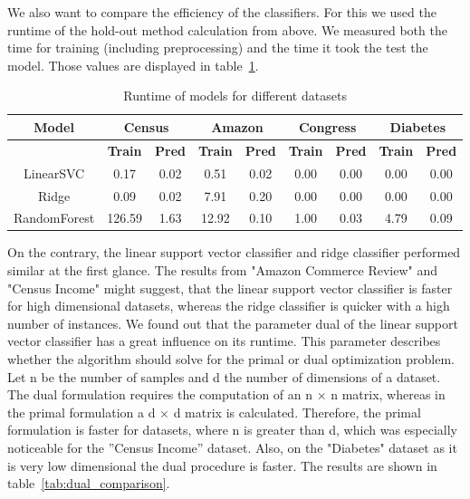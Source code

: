 \documentclass[a4paper,10pt]{article}
\begin{document}
 




We also want to compare the efficiency of the classifiers. For this we used the runtime of the hold-out
method calculation from above. We measured both the time for training (including preprocessing) and
the time it took the test the model. Those values are displayed in table~\ref{tab:runtime_models}.


\begin{table}[h!]
\centering
\footnotesize
\begin{tabular}{|c|c|c|c|c|c|c|c|c|}
\hline
\textbf{Model} & \multicolumn{2}{c|}{Census} & \multicolumn{2}{c|}{Amazon} & \multicolumn{2}{c|}{Congress} & \multicolumn{2}{c|}{Diabetes} \\
\hline
& \textbf{Train} & \textbf{Pred} & \textbf{Train} & \textbf{Pred} & \textbf{Train} & \textbf{Pred} & \textbf{Train} & \textbf{Pred} \\
\hline
LinearSVC & 0.17 & 0.02 & 0.51 & 0.02 & 0.00 & 0.00 & 0.00 & 0.00 \\
\hline
Ridge & 0.09 & 0.02 & 7.91 & 0.20 & 0.00 & 0.00 & 0.00 & 0.00 \\
\hline
RandomForest & 126.59 & 1.63 & 12.92 & 0.10 & 1.00 & 0.03 & 4.79 & 0.09 \\
\hline
\end{tabular}
\vspace{0.3cm}
\caption{Runtime of models for different datasets}
\label{tab:runtime_models}
\end{table}




On the contrary, the linear support vector classifier and ridge classifier performed similar
at the first glance. The results from "Amazon Commerce Review" and "Census Income" might suggest,
that the linear support vector classifier is faster for high dimensional datasets, whereas the ridge classifier
is quicker with a high number of instances. We found out that the parameter dual of the linear support
vector classifier has a great influence on its runtime. This parameter describes whether the algorithm
should solve for the primal or dual optimization problem. Let n be the number of samples and d the number
of dimensions of a dataset. The dual formulation requires the computation of an n × n matrix, whereas
in the primal formulation a d × d matrix is calculated. Therefore, the primal formulation is faster for
datasets, where n is greater than d, which was especially noticeable for the ”Census Income” dataset. Also, on the "Diabetes"
dataset as it is very low dimensional the dual procedure is faster. The results are shown in table~\ref{tab:dual_comparison}.
\end{document}
